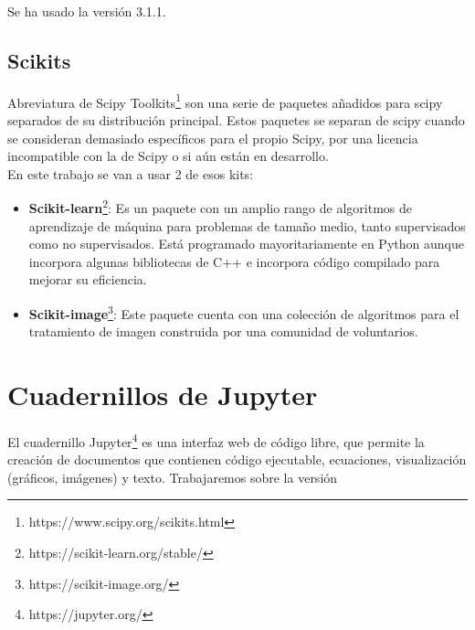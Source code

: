 \documentclass[a4paper,12pt]{report}
\begin{document}
Se ha usado la versión 3.1.1.\\

\subsection{Scikits}

Abreviatura de Scipy Toolkits\footnote{https://www.scipy.org/scikits.html} son una serie de paquetes añadidos para scipy separados de su distribución principal. Estos paquetes se separan de scipy cuando se consideran demasiado específicos para el propio Scipy, por una licencia incompatible con la de Scipy o si aún están en desarrollo.\\

En este trabajo se van a usar 2 de esos kits:\\


\begin{itemize}

	\item \textbf{Scikit-learn}\footnote{https://scikit-learn.org/stable/}: Es un paquete con un amplio rango de algoritmos de aprendizaje de máquina para problemas de tamaño medio, tanto supervisados como no supervisados. Está programado mayoritariamente en Python aunque incorpora algunas bibliotecas de C++ e incorpora código compilado para mejorar su eficiencia.

	\item \textbf{Scikit-image}\footnote{https://scikit-image.org/}: Este paquete cuenta con una colección de algoritmos para el tratamiento de imagen construida por una comunidad de voluntarios.
\end{itemize}
\section{ Cuadernillos de Jupyter}

El cuadernillo Jupyter\footnote{https://jupyter.org/} es una interfaz web de código libre, que permite la creación de documentos que contienen código ejecutable, ecuaciones, visualización (gráficos, imágenes) y texto. Trabajaremos sobre la versión \\
\end{document}
